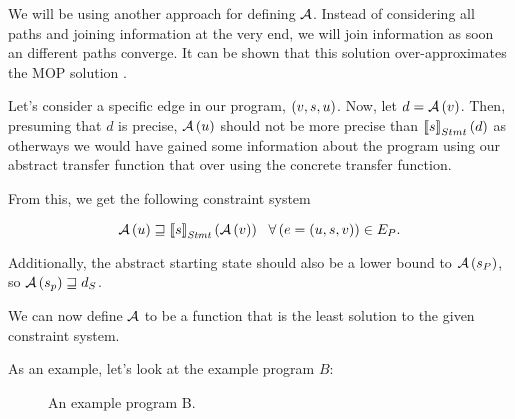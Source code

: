 \documentclass[..thesis.tex]{subfiles}
\begin{document}
We will be using another approach for defining $\mathcal{A}$. Instead of considering all paths and joining information at the very end,
we will join information as soon an different paths converge. It can be shown that this solution over-approximates the MOP solution \cite[80]{nielson_principles_1999}.

Let's consider a specific edge in our program, $\left( v, s, u \right)$. Now, let $d = \mathcal{A} \left( v \right)$. Then, presuming that $d$ is precise,
$\mathcal{A} \left( u \right) $ should not be more precise than $\left\llbracket s \right\rrbracket_{Stmt} \left( d \right)$ as otherways we would have gained some information about
the program using our abstract transfer function that over using the concrete transfer function.

From this, we get the following constraint system

\begin{equation}
\label{constraints}
\mathcal{A} \left(  u \right) \sqsupseteq \left\llbracket s \right\rrbracket_{\mathit{Stmt}} \left( \mathcal{A} \left( v \right) \right) ~~ \forall \left( e = \left( u, s, v \right) \right) \in E_P \text{.}
\end{equation}

Additionally, the abstract starting state should also be a lower bound to $\mathcal{A} \left( s_P \right)$, so $\mathcal{A} \left( s_p \right) \sqsupseteq d_S$. 

We can now define $\mathcal{A}$ to be a function that is the least solution to the given constraint system.


As an example, let's look at the example program $B$: 

\begin{figure}[H]
  \centering
  \caption{An example program B.}
\end{figure}
\end{document}
